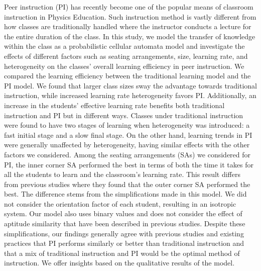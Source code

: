 Peer instruction (PI) has recently become one of the popular means of classroom instruction in Physics Education. 
Such instruction method is vastly different from how classes are traditionally handled where the instructor conducts a lecture for the entire duration of the class.
In this study, we model the transfer of knowledge within the class as a probabilistic cellular automata model and investigate the effects of different factors such as seating arrangements, size, learning rate, and heterogeneity on the classes' overall learning efficiency in peer instruction.
We compared the learning efficiency between the traditional learning model and the PI model. 
We found that larger class sizes sway the advantage towards traditional instruction, while increased learning rate heterogeneity favors PI.
Additionally, an increase in the students' effective learning rate benefits both traditional instruction and PI but in different ways.
Classes under traditional instruction were found to have two stages of learning when heterogeneity was introduced: a fast initial stage and a slow final stage.
On the other hand, learning trends in PI were generally unaffected by heterogeneity, having similar effects with the other factors we considered.
Among the seating arrangements (SAs) we considered for PI, the inner corner SA performed the best in terms of both the time it takes for all the students to learn and the classroom’s learning rate.
This result differs from previous studies where they found that the outer corner SA performed the best.
The difference stems from the simplifications made in this model.
We did not consider the orientation factor of each student, resulting in an isotropic system.
Our model also uses binary values and does not consider the effect of aptitude similarity that have been described in previous studies. 
Despite these simplifications, our findings generally agree with previous studies and existing practices that PI performs similarly or better than traditional instruction and that a mix of traditional instruction and PI would be the optimal method of instruction.
We offer insights based on the qualitative results of the model.

